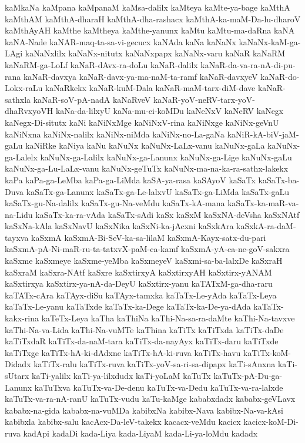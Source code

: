 {kaMkaNa
kaMpana
kaMpanaM
kaMsa-dalilx
kaMteya
kaMte-ya-bage
kaMthA
kaMthAM
kaMthA-dharaH
kaMthA-dha-rashacx
kaMthA-ka-maM-Da-lu-dharoV
kaMthAyAH
kaMthe
kaMtheya
kaMthe-yanunx
kaMtu
kaMtu-ma-daRna
kaNA
kaNA-Nade
kaNAR-maq-ta-sa-vi-gecucx
kaNAda
kaNa
kaNaNx
kaNaNx-kaM-ga-LAgi
kaNaNxlilx
kaNaNx-nitutx
kaNaNxpapx
kaNaNx-varu
kaNaR
kaNaRM
kaNaRM-ga-LoLf
kaNaR-dAvx-ra-doLu
kaNaR-dalilx
kaNaR-da-va-ra-nA-di-pu-rana
kaNaR-davxya
kaNaR-davx-ya-ma-naM-ta-ramf
kaNaR-davxyeV
kaNaR-do-Lokx-raLu
kaNaRkekx
kaNaR-kuM-Dala
kaNaR-maM-tarx-diM-dave
kaNaR-sathxla
kaNaR-soV-pA-nadA
kaNaRveV
kaNaR-yoV-neRV-tarx-yoV-dhaRvxyoVH
kaNa-da-lilxyU
kaNa-mu-ci-koMDu
kaNeNxV
kaNeRV
kaNegx
kaNegx-Di-situtx
kaNi
kaNiNxMge
kaNiNxV-rina
kaNiNxge
kaNiNx-geVnU
kaNiNxna
kaNiNx-nalilx
kaNiNx-niMda
kaNiNx-no-La-gaNa
kaNiR-kA-biV-jaM-gaLu
kaNiRke
kaNiya
kaNu
kaNuNx
kaNuNx-LaLx-vanu
kaNuNx-gaLa
kaNuNx-ga-Lalelx
kaNuNx-ga-Lalilx
kaNuNx-ga-Lanunx
kaNuNx-ga-Lige
kaNuNx-gaLu
kaNuNx-ga-Lu-LaLx-vanu
kaNuNx-geTuTx
kaNuNx-ma-na-ka-ra-sathx-lakekx
kaPa
kaPa-ga-LeMba
kaPa-ga-LiMda
kaSA-ya-rasa
kaSAyoV
kaSaTx
kaSaTx-ba-Duva
kaSaTx-ga-Lanunx
kaSaTx-ga-Le-lalxvU
kaSaTx-ga-LiMda
kaSaTx-gaLu
kaSaTx-gu-Na-dalilx
kaSaTx-gu-Na-veMdu
kaSaTx-kA-mana
kaSaTx-ka-maR-va-na-Lidu
kaSaTx-ka-ra-vAda
kaSaTx-sAdi
kaSx
kaSxM
kaSxNA-deVsha
kaSxNAtf
kaSxNa-kAla
kaSxNavU
kaSxNika
kaSxNi-ka-jAcxni
kaSxkAra
kaSxkA-ra-daM-tayxva
kaSxmA
kaSxmA-Bi-SeV-ka-sa-lilaM
kaSxmA-Kayx-satx-du-pari
kaSxmA-pA-Ni-maR-ru-ta-tatxvX-paM-ca-kamf
kaSxmA-yA-ca-ne-goV-sakxra
kaSxme
kaSxmeye
kaSxme-yeMba
kaSxmeyeV
kaSxmi-sa-ba-lalxDe
kaSxraH
kaSxraM
kaSxra-NAtf
kaSxre
kaSxtirxyA
kaSxtirxyAH
kaSxtirx-yANAM
kaSxtirxya
kaSxtirx-ya-nA-da-DeyU
kaSxtirx-yanu
kaTATxM-ga-dha-raru
kaTATx-cAra
kaTAyx-diSu
kaTAyx-tamxka
kaTaTx-Le-yAda
kaTaTx-Leya
kaTaTx-Le-yanu
kaTaTxde
kaTaTx-ka-Dege
kaTaTx-ka-De-ya-dAda
kaTaTx-kakx-rina
kaTeTx-Leya
kaTha
kaThiNa
kaThi-Na-sa-ra-daMte
kaThi-Na-tavxve
kaThi-Na-va-Lida
kaThi-Na-vuMTe
kaThina
kaTiTx
kaTiTxda
kaTiTx-daDe
kaTiTxdaR
kaTiTx-da-naM-tara
kaTiTx-da-nayAyx
kaTiTx-daru
kaTiTxde
kaTiTxge
kaTiTx-hA-ki-dAdxne
kaTiTx-hA-ki-ruva
kaTiTx-havu
kaTiTx-koM-Didadx
kaTiTx-ralu
kaTiTx-ruva
kaTiTx-yoV-sa-ri-sa-dipapx
kaTi-sAnxna
kaTi-sUtarx
kaTi-yalilx
kaTi-ya-lilxdudx
kaTi-yoLaM
kaTuTx
kaTuTx-pA-Du-ga-Lanunx
kaTuTxva
kaTuTx-va-De-denu
kaTuTx-va-Dedu
kaTuTx-va-ra-lalxde
kaTuTx-va-ra-nA-ranU
kaTuTx-vudu
kaTu-kaMge
kababxdadx
kababx-geVLavx
kababx-na-gida
kababx-na-vuMDa
kabibxNa
kabibx-Nava
kabibx-Na-va-kAsi
kabibxla
kabibx-salu
kacAcx-Da-leV-takekx
kacacx-veMdu
kacicx
kacicx-koM-Di-ruva
kadApi
kadaDi
kada-Liya
kada-LiyaM
kada-Li-ya-loMdu
kadadx
}
